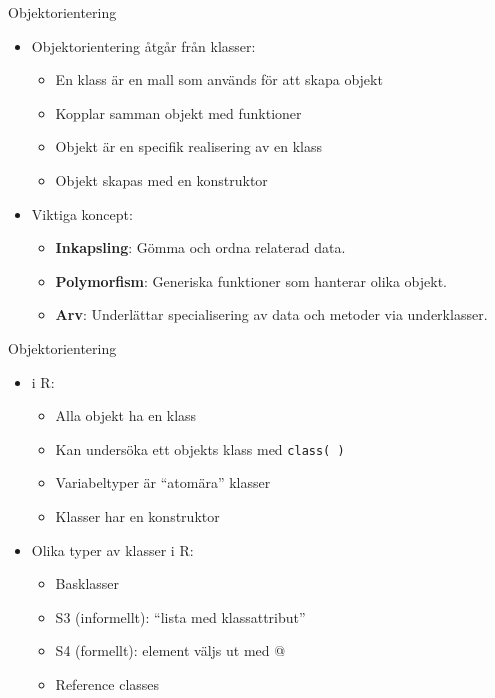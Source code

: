 \documentclass[
  11pt,
  ignorenonframetext,
  handout]{beamer}
\providecommand{\tightlist}{%
  \setlength{\itemsep}{0pt}\setlength{\parskip}{0pt}}
\begin{document}
\begin{frame}{Objektorientering}
\protect{}\label{objektorientering}
\begin{itemize}
\tightlist
\item
  Objektorientering åtgår från klasser:

  \begin{itemize}
  \tightlist
  \item
    En klass är en mall som används för att skapa objekt
  \item
    Kopplar samman objekt med funktioner
  \item
    Objekt är en specifik realisering av en klass
  \item
    Objekt skapas med en konstruktor
  \end{itemize}
\item
  Viktiga koncept:

  \begin{itemize}
  \tightlist
  \item
    \textbf{Inkapsling}: Gömma och ordna relaterad data.
  \item
    \textbf{Polymorfism}: Generiska funktioner som hanterar olika
    objekt.
  \item
    \textbf{Arv}: Underlättar specialisering av data och metoder via
    underklasser.
  \end{itemize}
\end{itemize}
\end{frame}

\begin{frame}{Objektorientering}
\protect{}\label{objektorientering-1}
\begin{itemize}
\tightlist
\item
  i R:

  \begin{itemize}
  \tightlist
  \item
    Alla objekt ha en klass
  \item
    Kan undersöka ett objekts klass med \texttt{class( )}
  \item
    Variabeltyper är ``atomära'' klasser
  \item
    Klasser har en konstruktor
  \end{itemize}
\item
  Olika typer av klasser i R:

  \begin{itemize}
  \tightlist
  \item
    Basklasser
  \item
    S3 (informellt): ``lista med klassattribut''
  \item
    S4 (formellt): element väljs ut med @
  \item
    Reference classes
  \end{itemize}
\end{itemize}
\end{frame}
\end{document}
